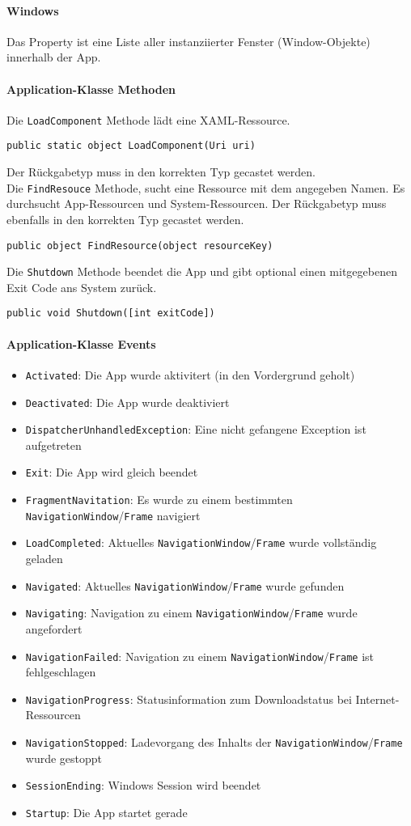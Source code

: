 \paragraph{Windows} Das  Property ist eine Liste aller instanziierter Fenster (Window-Objekte) innerhalb der App.
\paragraph{Application-Klasse Methoden} Die \verb+LoadComponent+ Methode lädt eine XAML-Ressource.
\begin{lstlisting}
public static object LoadComponent(Uri uri)
\end{lstlisting}
Der Rückgabetyp muss in den korrekten Typ gecastet werden.\\
Die \verb+FindResouce+ Methode, sucht eine Ressource mit dem angegeben Namen. Es durchsucht App-Ressourcen und System-Ressourcen. Der Rückgabetyp muss ebenfalls in den korrekten Typ gecastet werden.
\begin{lstlisting}
public object FindResource(object resourceKey)
\end{lstlisting}
Die \verb+Shutdown+ Methode beendet die App und gibt optional einen mitgegebenen Exit Code ans System zurück.
\begin{lstlisting}
public void Shutdown([int exitCode])
\end{lstlisting}
\paragraph{Application-Klasse Events}
\begin{itemize}
\item \verb+Activated+: Die App wurde aktivitert (in den Vordergrund geholt)
\item \verb+Deactivated+: Die App wurde deaktiviert
\item \verb+DispatcherUnhandledException+: Eine nicht gefangene Exception ist aufgetreten
\item \verb+Exit+: Die App wird gleich beendet
\item \verb+FragmentNavitation+: Es wurde zu einem bestimmten \verb+NavigationWindow+/\verb+Frame+ navigiert
\item \verb+LoadCompleted+: Aktuelles \verb+NavigationWindow+/\verb+Frame+ wurde vollständig geladen
\item \verb+Navigated+: Aktuelles \verb+NavigationWindow+/\verb+Frame+ wurde gefunden
\item \verb+Navigating+: Navigation zu einem \verb+NavigationWindow+/\verb+Frame+  wurde angefordert
\item \verb+NavigationFailed+: Navigation zu einem \verb+NavigationWindow+/\verb+Frame+ ist fehlgeschlagen
\item \verb+NavigationProgress+: Statusinformation zum Downloadstatus bei Internet-Ressourcen
\item \verb+NavigationStopped+: Ladevorgang des Inhalts der \verb+NavigationWindow+/\verb+Frame+ wurde gestoppt
\item \verb+SessionEnding+: Windows Session wird beendet
\item \verb+Startup+: Die App startet gerade
\end{itemize}
